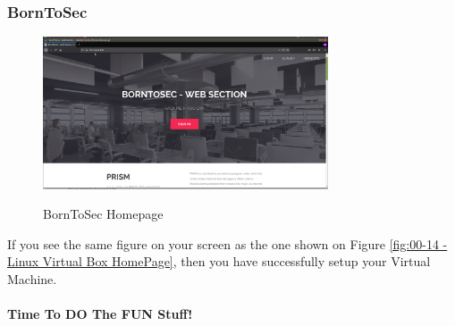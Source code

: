 \subsubsection{BornToSec}
\begin{figure}[!htb]
    \centering
    \includegraphics[width=0.752\textwidth]{images/00-14.png}\\[0cm]  
    \caption[Virtual Box]{BornToSec Homepage}
    \label{fig:00-14 - Linux Virtual Box HomePage} 
\end{figure}
If you see the same figure on your screen as the one shown on Figure \vref{fig:00-14 - Linux Virtual Box HomePage},
then you have successfully setup your Virtual Machine.

\paragraph{Time To DO The FUN Stuff!}
